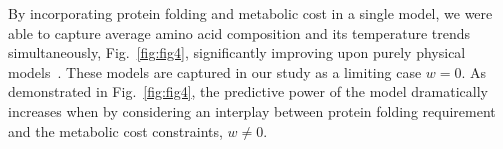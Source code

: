 \documentclass[10pt,letterpaper]{article}
\begin{document}

By incorporating protein folding and metabolic cost in a single model, we were able to capture average amino acid composition and its temperature trends simultaneously, Fig.~\ref{fig:fig4}, significantly improving upon purely physical models~\cite{Berezovsky2007Positive,Venev2015Massively}. These  models are captured in our study as a limiting case $\mathit{w}=0$. As demonstrated in Fig.~\ref{fig:fig4}, the predictive power of the model dramatically increases when by considering an interplay between protein folding requirement and the metabolic cost constraints, $w\neq 0$.

\end{document}
